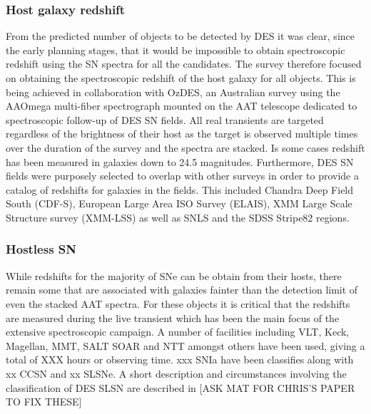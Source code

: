 \subsubsection{Host galaxy redshift}
From the predicted number of objects to be detected by DES it was clear, since the early planning stages, that it would be impossible to obtain spectroscopic redshift using the SN spectra for all the candidates. The survey therefore focused on obtaining the spectroscopic redshift of the host galaxy for all objects. This is being achieved in collaboration with OzDES, an Australian survey using the AAOmega multi-fiber spectrograph mounted on the AAT telescope dedicated to spectroscopic follow-up of DES SN fields. All real transients are targeted regardless of the brightness of their host as the target is observed multiple times over the duration of the survey and the spectra are stacked. Is some cases redshift has been measured in galaxies down to 24.5 magnitudes. Furthermore, DES SN fields were purposely selected to overlap with other surveys in order to provide a catalog of redshifts for galaxies in the fields. This included Chandra Deep Field South (CDF-S), European Large Area ISO Survey (ELAIS), XMM Large Scale Structure survey (XMM-LSS) as well as SNLS and the SDSS Stripe82 regions. 

\subsubsection{Hostless SN}
While redshifts for the majority of SNe can be obtain from their hosts, there remain some that are associated with galaxies fainter than the detection limit of even the stacked AAT spectra. For these objects it is critical that the redshifts are measured during the live transient which has been the main focus of the extensive spectroscopic campaign. A number of facilities including VLT, Keck, Magellan, MMT, SALT SOAR and NTT amongst others have been used, giving a total of XXX hours or observing time. xxx SNIa have been classifies along with xx CCSN and xx SLSNe. A short description and circumstances involving the classification of DES SLSN are described in  [ASK MAT FOR CHRIS'S PAPER TO FIX THESE]


